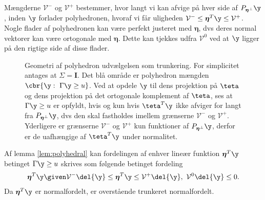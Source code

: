 Mængderne \(\mathcal{V}^-\) og \(\mathcal{V}^+\) bestemmer, hvor langt vi kan afvige på hver side af \(P_{\boldsymbol{\eta}^\perp} \y\), inden \(\y\) forlader polyhedronen, hvoraf vi får uligheden \(\mathcal{V}^- \leq \boldsymbol{\eta}^T \y \leq \mathcal{V}^+\).
Nogle flader af polyhedronen kan være perfekt justeret med \(\boldsymbol{\eta}\), dvs deres normal vektorer kan være ortogonale med \(\boldsymbol{\eta}\).
Dette kan tjekkes udfra \(\mathcal{V}^0\) ved at \(\y\) ligger på den rigtige side af disse flader.  

%
\begin{figure}[H]
\centering
\scalebox{1}{}
\caption{Geometri af polyhedron udvælgelsen som trunkering. For simplicitet antages at \(\Sigma = \mathbf{I}\). Det blå område er polyhedron mængden \(\cbr{\y : \ \Gamma \y \geq u}\).
Ved at opdele \(\y\) til dens projektion på \(\teta\) og dens projektion på det ortogonale komplement af \(\teta\), ses at \(\Gamma \y \geq u\) er opfyldt, hvis og kun hvis \(\teta^T \y\) ikke afviger for langt fra \(P_{\boldsymbol{\eta}^\perp} \y\), dvs den skal fastholdes imellem grænserne \(\mathcal{V}^-\) og \(\mathcal{V}^+\).
Yderligere er grænserne \(\mathcal{V}^-\) og \(\mathcal{V}^+\) kun funktioner af \(P_{\boldsymbol{\eta}^\perp} \y\), derfor er de uafhængige af \(\teta^T \y\) under normalitet.} \label{fig:polyhedron}
\end{figure}
%

Af lemma \ref{lem:polyhedral} kan fordelingen af enhver lineær funktion \(\boldsymbol{\eta}^T \y\) betinget \(\Gamma \y \geq u\) skrives som følgende betinget fordeling
\begin{align*}
\boldsymbol{\eta}^T \y \given \mathcal{V}^- \del{\y} \leq \boldsymbol{\eta}^T \y \leq \mathcal{V}^+ \del{\y}, \ \mathcal{V}^0 \del{\y} \leq 0.
\end{align*}
Da \(\boldsymbol{\eta}^T \y\) er normalfordelt, er overstående trunkeret normalfordelt.

